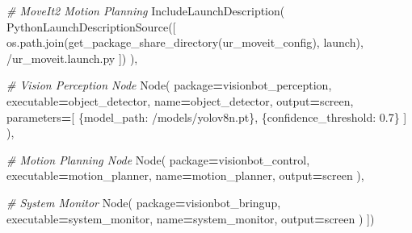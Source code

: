 \documentclass[
]{article}
\newenvironment{Shaded}{\begin{snugshade}}{\end{snugshade}}
\newcommand{\CommentTok}[1]{\textcolor[rgb]{0.56,0.35,0.01}{\textit{#1}}}
\newcommand{\FloatTok}[1]{\textcolor[rgb]{0.00,0.00,0.81}{#1}}
\newcommand{\NormalTok}[1]{#1}
\newcommand{\OperatorTok}[1]{\textcolor[rgb]{0.81,0.36,0.00}{\textbf{#1}}}
\newcommand{\StringTok}[1]{\textcolor[rgb]{0.31,0.60,0.02}{#1}}
\begin{document}
\begin{Shaded}
\begin{Highlighting}[]
        \CommentTok{\# MoveIt2 Motion Planning}
\NormalTok{        IncludeLaunchDescription(}
\NormalTok{            PythonLaunchDescriptionSource([}
\NormalTok{                os.path.join(get\_package\_share\_directory(}\StringTok{\textquotesingle{}ur\_moveit\_config\textquotesingle{}}\NormalTok{), }\StringTok{\textquotesingle{}launch\textquotesingle{}}\NormalTok{),}
                \StringTok{\textquotesingle{}/ur\_moveit.launch.py\textquotesingle{}}
\NormalTok{            ])}
\NormalTok{        ),}

        \CommentTok{\# Vision Perception Node}
\NormalTok{        Node(}
\NormalTok{            package}\OperatorTok{=}\StringTok{\textquotesingle{}visionbot\_perception\textquotesingle{}}\NormalTok{,}
\NormalTok{            executable}\OperatorTok{=}\StringTok{\textquotesingle{}object\_detector\textquotesingle{}}\NormalTok{,}
\NormalTok{            name}\OperatorTok{=}\StringTok{\textquotesingle{}object\_detector\textquotesingle{}}\NormalTok{,}
\NormalTok{            output}\OperatorTok{=}\StringTok{\textquotesingle{}screen\textquotesingle{}}\NormalTok{,}
\NormalTok{            parameters}\OperatorTok{=}\NormalTok{[}
\NormalTok{                \{}\StringTok{\textquotesingle{}model\_path\textquotesingle{}}\NormalTok{: }\StringTok{\textquotesingle{}/models/yolov8n.pt\textquotesingle{}}\NormalTok{\},}
\NormalTok{                \{}\StringTok{\textquotesingle{}confidence\_threshold\textquotesingle{}}\NormalTok{: }\FloatTok{0.7}\NormalTok{\}}
\NormalTok{            ]}
\NormalTok{        ),}

        \CommentTok{\# Motion Planning Node}
\NormalTok{        Node(}
\NormalTok{            package}\OperatorTok{=}\StringTok{\textquotesingle{}visionbot\_control\textquotesingle{}}\NormalTok{,}
\NormalTok{            executable}\OperatorTok{=}\StringTok{\textquotesingle{}motion\_planner\textquotesingle{}}\NormalTok{,}
\NormalTok{            name}\OperatorTok{=}\StringTok{\textquotesingle{}motion\_planner\textquotesingle{}}\NormalTok{,}
\NormalTok{            output}\OperatorTok{=}\StringTok{\textquotesingle{}screen\textquotesingle{}}
\NormalTok{        ),}

        \CommentTok{\# System Monitor}
\NormalTok{        Node(}
\NormalTok{            package}\OperatorTok{=}\StringTok{\textquotesingle{}visionbot\_bringup\textquotesingle{}}\NormalTok{,}
\NormalTok{            executable}\OperatorTok{=}\StringTok{\textquotesingle{}system\_monitor\textquotesingle{}}\NormalTok{,}
\NormalTok{            name}\OperatorTok{=}\StringTok{\textquotesingle{}system\_monitor\textquotesingle{}}\NormalTok{,}
\NormalTok{            output}\OperatorTok{=}\StringTok{\textquotesingle{}screen\textquotesingle{}}
\NormalTok{        )}
\NormalTok{    ])}
\end{Highlighting}
\end{Shaded}
\end{document}
